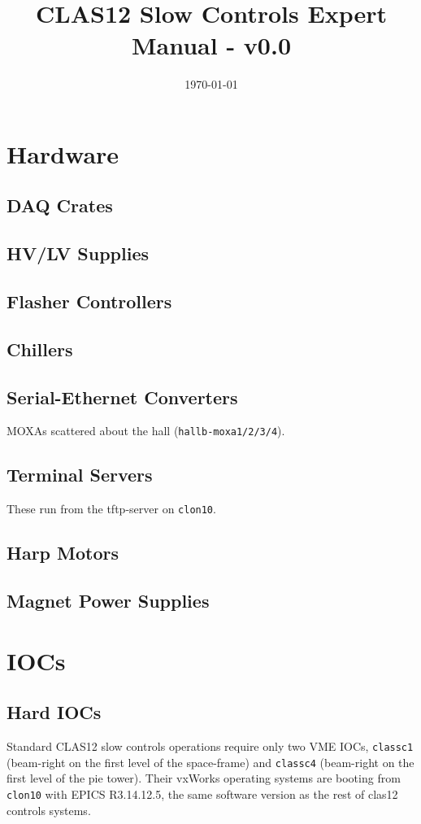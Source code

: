 \documentclass[amsmath,amssymb,notitlepage,11pt]{revtex4}
\begin{document}
\title{CLAS12 Slow Controls Expert Manual - v0.0}
\date{\today}
\begin{abstract}
\end{abstract}

\maketitle
\tableofcontents
\newpage

\section{Hardware}
\subsection{DAQ Crates}
\subsection{HV/LV Supplies}
\subsection{Flasher Controllers}
\subsection{Chillers}
\subsection{Serial-Ethernet Converters}
MOXAs scattered about the hall (\texttt{hallb-moxa1/2/3/4}).
\subsection{Terminal Servers}
These run from the tftp-server on \texttt{clon10}.
\subsection{Harp Motors}
\subsection{Magnet Power Supplies}

\section{IOCs}

\subsection{Hard IOCs}
Standard CLAS12 slow controls operations require only two VME IOCs, \texttt{classc1} (beam-right on the first level of the space-frame) and \texttt{classc4} (beam-right on the first level of the pie tower).  Their vxWorks operating systems are booting from \texttt{clon10} with EPICS R3.14.12.5, the same software version as the rest of clas12 controls systems.
\end{document}
